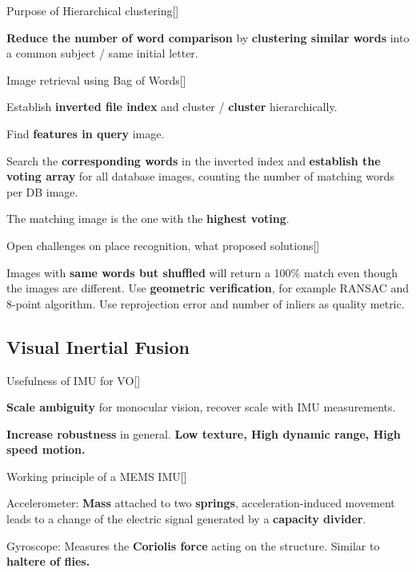 \documentclass[10pt,a4paper]{scrartcl}
\begin{document}
\begin{multicols*}{2}
\begin{QandA}{Purpose of Hierarchical clustering}[\Application]
\item \textbf{Reduce the number of word comparison} by \textbf{clustering similar words} into a common subject / same initial letter.
\end{QandA}

\begin{QandA}{Image retrieval using Bag of Words}[\Derivation]
\item Establish \textbf{inverted file index} and cluster / \textbf{cluster} hierarchically.
\item Find \textbf{features in query} image.
\item Search the \textbf{corresponding words} in the inverted index and \textbf{establish the voting array} for all database images, counting the number of matching words per DB image.
\item The matching image is the one with the \textbf{highest voting}.
\end{QandA}

\begin{QandA}{Open challenges on place recognition, what proposed solutions}[\Application]
\item Images with \textbf{same words but shuffled} will return a 100\% match even though the images are different. Use \textbf{geometric verification}, for example RANSAC and 8-point algorithm. Use reprojection error and number of inliers as quality metric.
\end{QandA}

\subsection*{Visual Inertial Fusion}

\begin{QandA}{Usefulness of IMU for VO}[\Application]
\item \textbf{Scale ambiguity} for monocular vision, recover scale with IMU measurements.
\item \textbf{Increase robustness} in general. \textbf{Low texture, High dynamic range, High speed motion.}
\end{QandA}

\begin{QandA}
{Working principle of a MEMS IMU}[\Application]
\item Accelerometer: \textbf{Mass} attached to two \textbf{springs}, acceleration-induced movement leads to a change of the electric signal generated by a \textbf{capacity divider}.
\item Gyroscope: Measures the \textbf{Coriolis force} acting on the structure. Similar to \textbf{haltere of flies.}
\end{QandA}


\end{multicols*}
\end{document}
